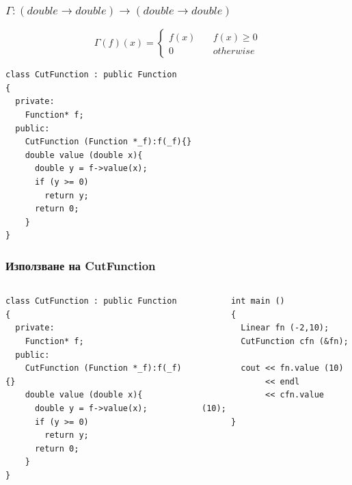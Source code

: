 \documentclass{beamer}
\begin{document}
\begin{frame}[fragile]
\frametitle{$\Gamma:(double \rightarrow double)\rightarrow(double \rightarrow double)$}

\begin{center}
$$
\Gamma(f)(x) = \left\{
        \begin{array}{ll}
            f(x) & \quad f(x) \geq 0 \\
            0 & \quad otherwise
        \end{array}
    \right.
$$

\begin{lstlisting}
class CutFunction : public Function
{
  private:
    Function* f;
  public:
    CutFunction (Function *_f):f(_f){}
    double value (double x){
      double y = f->value(x);
      if (y >= 0)
        return y;
      return 0;
    }
}
\end{lstlisting}
  
\end{center}


\end{frame}


\begin{frame}[fragile]
\frametitle{Използване на CutFunction}


\begin{columns}[t]
  \begin{column}{0.50\textwidth}


      \begin{flushleft}
\begin{lstlisting}
class CutFunction : public Function
{
  private:
    Function* f;
  public:
    CutFunction (Function *_f):f(_f){}
    double value (double x){
      double y = f->value(x);
      if (y >= 0)
        return y;
      return 0;
    }
}
\end{lstlisting}
        
      \end{flushleft}

  \end{column}
  \begin{column}{0.5\textwidth}
      \begin{flushleft}

      \begin{lstlisting}
      int main ()
      {
        Linear fn (-2,10);
        CutFunction cfn (&fn);

        cout << fn.value (10) 
             << endl
             << cfn.value (10);
      }
      \end{lstlisting}
        
      \end{flushleft}

  \end{column}
\end{columns}



\end{frame}
\end{document}
